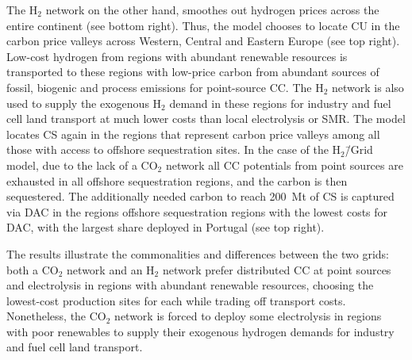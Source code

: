 \documentclass[twocolumn]{article}
\newcommand{\COtwo}{CO$_2$}
\newcommand{\Htwo}{H$_2$}
\newcommand{\modH}{H$_2$\=/Grid model}
\begin{document}
The \Htwo{} network on the other hand, smoothes out hydrogen prices across the entire continent (see bottom right). Thus, the model chooses to locate CU in the carbon price valleys across Western, Central and Eastern Europe (see top right). Low-cost hydrogen from regions with abundant renewable resources is transported to these regions with low-price carbon from abundant sources of fossil, biogenic and process emissions for point-source CC. The \Htwo{} network is also used to supply the exogenous \Htwo{} demand in these regions for industry and fuel cell land transport at much lower costs than local electrolysis or SMR.
The model locates CS again in the regions that represent carbon price valleys among all those with access to offshore sequestration sites. In the case of the \modH{}, due to the lack of a \COtwo{} network all CC potentials from point sources are exhausted in all offshore sequestration regions, and the carbon is then sequestered. The additionally needed carbon to reach 200~Mt of CS is captured via DAC in the regions offshore sequestration regions with the lowest costs for DAC, with the largest share deployed in Portugal (see top right).

The results illustrate the commonalities and differences between the two grids: both a \COtwo{} network and an \Htwo{} network prefer distributed CC at point sources and electrolysis in regions with abundant renewable resources, choosing the lowest-cost production sites for each while trading off transport costs. Nonetheless, the \COtwo{} network is forced to deploy some electrolysis in regions with poor renewables to supply their exogenous hydrogen demands for industry and fuel cell land transport.
\end{document}
